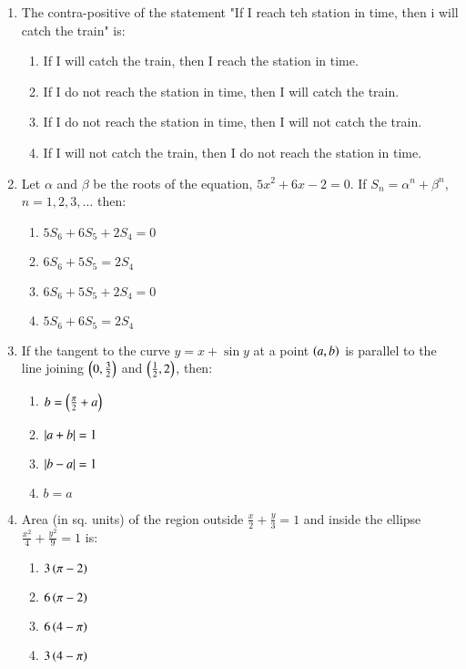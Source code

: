\documentclass[journal]{IEEEtran}
\begin{document}
\begin{enumerate}
\item The contra-positive of the statement "If I reach teh station in time, then i will catch the train" is:
\begin{multicols}{2}
    \begin{enumerate}
        \item If I will catch the train, then I reach the station in time.
        \item If I do not reach the station in time, then I will catch the train.
        \item  If I do not reach the station in time, then I will not catch the train.
        \item If I will not catch the train, then I do not reach the station in time.
    \end{enumerate}
\end{multicols}

\item Let $\alpha$ and $\beta$ be the roots of the equation, $5x^2+6x-2=0$. If $S_n = {\alpha}^n + {\beta}^n$, $n=1,2,3,\dots$ then:
\begin{multicols}{2}
    \begin{enumerate}
        \item $5S_6+6S_5+2S_4=0$
        \item $6S_6+5S_5=2S_4$
        \item $6S_6+5S_5+2S_4=0$
        \item $5S_6+6S_5=2S_4$
    \end{enumerate}
\end{multicols}

\item If the tangent to the curve $y=x+\sin y$ at a point $\left(a,b\right)$ is parallel to the line joining $\left(0,\frac{3}{2}\right)$ and $\left(\frac{1}{2},2\right)$, then:
\begin{multicols}{2}
    \begin{enumerate}
        \item $b=\left(\frac{\pi}{2}+a\right)$
        \item $\left\vert a+b\right\vert = 1$
        \item $\left\vert b-a\right\vert = 1$
        \item $b=a$
    \end{enumerate}
\end{multicols}

\item Area (in sq. units) of the region outside $\frac{x}{2} + \frac{y}{3} = 1$ and inside the ellipse $\frac{x^2}{4} + \frac{y^2}{9} = 1$ is:
\begin{multicols}{2}
    \begin{enumerate}
        \item $3\left(\pi - 2\right)$
        \item $6\left(\pi - 2\right)$
        \item $6\left(4 - \pi\right)$
        \item $3\left(4 - \pi\right)$
    \end{enumerate}
\end{multicols}


\end{enumerate}
\end{document}
